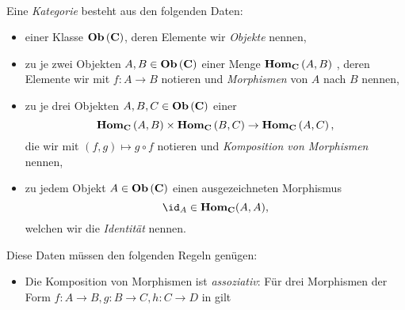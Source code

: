 \documentclass{article}
\begin{document}
		\begin{defi}[Kategorie]
		\cite[Definition 2.2.2]{Bra} \\
		Eine \emph{Kategorie} \CatC besteht aus den folgenden Daten:
		\begin{itemize}
			\item einer Klasse \(  \mathbf{Ob}  \left( \mathbf{C} \right) \), deren Elemente wir \emph{Objekte} nennen,
			\item zu je zwei Objekten 
			\begin{math}
				A,B \in  \mathbf{Ob}  \left( \mathbf{C}  \right) 
			\end{math}
			einer Menge 
			\begin{math}
				 \mathbf{Hom } _\mathbf{C} \left( A,B \right) 
			\end{math}
			, deren Elemente wir mit 
			\begin{math}
				f : A \to B 
			\end{math}
			notieren und \emph{Morphismen} von $ A $ nach $ B $ nennen,
			\item zu je drei Objekten 
			\begin{math}
		 A,B,C \in  \mathbf{Ob}  \left( \mathbf{C}  \right) 
			\end{math}	
			einer \Abb 
			\begin{displaymath}
				 \mathbf{Hom } _\mathbf{C} \left( A,B \right) \times  \mathbf{Hom } _\mathbf{C} \left( B,C \right) \to  \mathbf{Hom } _\mathbf{C} \left( A,C \right) ,
			\end{displaymath}
			die wir mit 
			\begin{math}
				\left( f,g \right) \mapsto g \circ f
			\end{math}
			notieren und \emph{Komposition von Morphismen} nennen, 
		\item zu jedem Objekt 
			\begin{math}
				A \in  \mathbf{Ob}  \left( \mathbf{C} \right)
			\end{math} 	
			einen ausgezeichneten Morphismus 
			\begin{displaymath}
				\id_A \in \Hom_\CatC ( A,A) ,
			\end{displaymath}
			welchen wir die \emph{Identit\"at} nennen.
		\end{itemize}
		Diese Daten m\"ussen den folgenden Regeln gen\"ugen:
		\begin{itemize}
			\item Die Komposition von Morphismen ist \emph{assoziativ}: F\"ur drei Morphismen der Form
			\begin{math}
				f: A \to B , g: B \to C, h:C \to D 
			\end{math}
			in \CatC gilt 

\end{itemize}
\end{defi}
\end{document}
